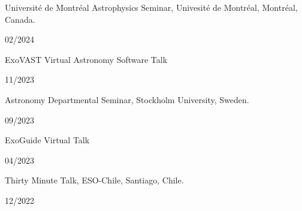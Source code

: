 \documentclass[12pt, a4paper]{article} %
\begin{document}
\begin{minipage}[t]{0.7\textwidth}
\begin{flushleft}%
  \setlength{\leftskip}{0.2cm}%
Universit\'e de Montr\'eal Astrophysics Seminar, Univesit\'e de Montr\'eal, Montr\'eal, Canada.
\end{flushleft}
\end{minipage}
\begin{minipage}[t]{0.3\textwidth}
\hfill 02/2024
\end{minipage}
\vspace{0.2cm}

\begin{minipage}[t]{0.7\textwidth}
\begin{flushleft}%
  \setlength{\leftskip}{0.2cm}%
ExoVAST Virtual Astronomy Software Talk
\end{flushleft}
\end{minipage}
\begin{minipage}[t]{0.3\textwidth}
\hfill 11/2023
\end{minipage}
\vspace{0.2cm}

\begin{minipage}[t]{0.7\textwidth}
\begin{flushleft}%
  \setlength{\leftskip}{0.2cm}%
Astronomy Departmental Seminar, Stockholm University, Sweden.
\end{flushleft}
\end{minipage}
\begin{minipage}[t]{0.3\textwidth}
\hfill 09/2023
\end{minipage}
\vspace{0.2cm}


\begin{minipage}[t]{0.7\textwidth}
\begin{flushleft}%
  \setlength{\leftskip}{0.2cm}%
ExoGuide Virtual Talk
\end{flushleft}
\end{minipage}
\begin{minipage}[t]{0.3\textwidth}
\hfill 04/2023
\end{minipage}
\vspace{0.2cm}


\begin{minipage}[t]{0.7\textwidth}
\begin{flushleft}%
  \setlength{\leftskip}{0.2cm}%
Thirty Minute Talk, ESO-Chile, Santiago, Chile.
\end{flushleft}
\end{minipage}
\begin{minipage}[t]{0.3\textwidth}
\hfill 12/2022
\end{minipage}
\vspace{0.2cm}
\end{document}
